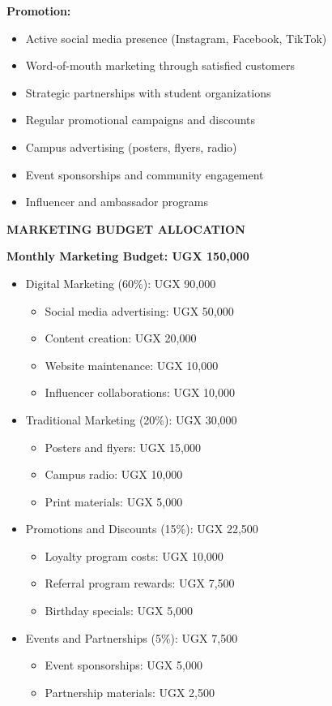 \documentclass[a4paper,12pt]{article}
\begin{document}
\textbf{Promotion:}
\begin{itemize}[leftmargin=2em]
    \item Active social media presence (Instagram, Facebook, TikTok)
    \item Word-of-mouth marketing through satisfied customers
    \item Strategic partnerships with student organizations
    \item Regular promotional campaigns and discounts
    \item Campus advertising (posters, flyers, radio)
    \item Event sponsorships and community engagement
    \item Influencer and ambassador programs
\end{itemize}

\vspace{1em}

\textbf{MARKETING BUDGET ALLOCATION}

\textbf{Monthly Marketing Budget: UGX 150,000}

\begin{itemize}[leftmargin=2em]
    \item Digital Marketing (60\%): UGX 90,000
    \begin{itemize}
        \item Social media advertising: UGX 50,000
        \item Content creation: UGX 20,000
        \item Website maintenance: UGX 10,000
        \item Influencer collaborations: UGX 10,000
    \end{itemize}
    
    \item Traditional Marketing (20\%): UGX 30,000
    \begin{itemize}
        \item Posters and flyers: UGX 15,000
        \item Campus radio: UGX 10,000
        \item Print materials: UGX 5,000
    \end{itemize}
    
    \item Promotions and Discounts (15\%): UGX 22,500
    \begin{itemize}
        \item Loyalty program costs: UGX 10,000
        \item Referral program rewards: UGX 7,500
        \item Birthday specials: UGX 5,000
    \end{itemize}
    
    \item Events and Partnerships (5\%): UGX 7,500
    \begin{itemize}
        \item Event sponsorships: UGX 5,000
        \item Partnership materials: UGX 2,500
    \end{itemize}
\end{itemize}
\end{document}
